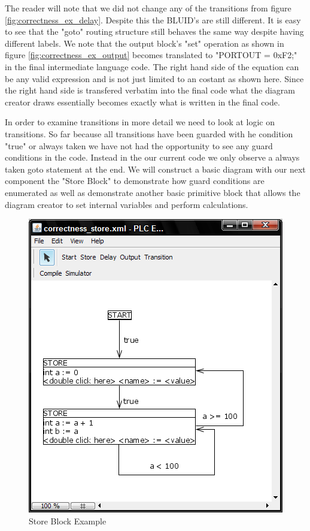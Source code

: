 The reader will note that we did not change any of the transitions from figure \ref{fig:correctness_ex_delay}. Despite this the BLUID's are still different. It is easy to see that the "goto" routing structure still behaves the same way despite having different labels. We note that the output block's "set" operation as shown in figure \ref{fig:correctness_ex_output} becomes translated to "PORTOUT = 0xF2;" in the final intermediate language code. The right hand side of the equation can be any valid expression and is not just limited to an costant as shown here. Since the right hand side is transfered verbatim into the final code what the diagram creator draws essentially becomes exactly what is written in the final code.

In order to examine transitions in more detail we need to look at logic on transitions. So far because all transitions have been guarded with he condition "true" or always taken we have not had the opportunity to see any guard conditions in the code. Instead in the our current code we only observe a always taken goto statement at the end. We will construct a basic diagram with our next component the "Store Block" to demonstrate how guard conditions are enumerated as well as demonstrate another basic primitive block that allows the diagram creator to set internal variables and perform calculations.

\begin{figure}[htb]
	\centering
	\includegraphics[width=\imgmedphoto]{./images/correctness_ex_store.png}
	\caption{Store Block Example}
	\label{fig:correctness_ex_store}
\end{figure}

